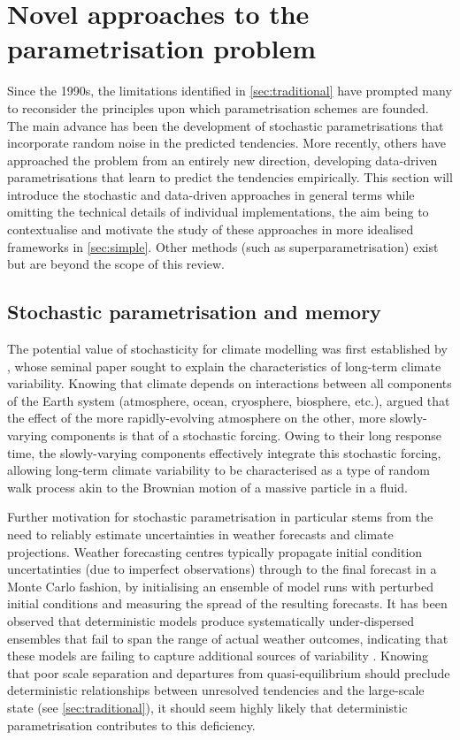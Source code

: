 \documentclass[titlepage,twoside]{article}
\numberwithin{equation}{section}
\begin{document}
\clearpage
\section{Novel approaches to the parametrisation problem}%
\label{sec:novel}
Since the 1990s, the limitations identified in \cref{sec:traditional} have
prompted many to reconsider the principles upon which parametrisation schemes
are founded. The main advance has been the development of stochastic
parametrisations that incorporate random noise in the predicted tendencies.
More recently, others have approached the problem from an entirely new
direction, developing data-driven parametrisations that learn to predict the
tendencies empirically. This section will introduce the stochastic and
data-driven approaches in general terms while omitting the technical details of
individual implementations, the aim being to contextualise and motivate the
study of these approaches in more idealised frameworks in \cref{sec:simple}.
Other methods (such as superparametrisation) exist but are beyond the scope of
this review.


\subsection{Stochastic parametrisation and memory}
The potential value of stochasticity for climate modelling was first
established by \textcite{hasselmann1976}, whose seminal paper sought to explain
the characteristics of long-term climate variability. Knowing that climate
depends on interactions between all components of the Earth system
(atmosphere, ocean, cryosphere, biosphere, etc.), \citeauthor{hasselmann1976}
argued that the effect of the more rapidly-evolving atmosphere on the other,
more slowly-varying components is that of a stochastic forcing. Owing to
their long response time, the slowly-varying components effectively integrate
this stochastic forcing, allowing long-term climate variability to be
characterised as a type of random walk process akin to the Brownian motion
of a massive particle in a fluid.

Further motivation for stochastic parametrisation in particular stems from the
need to reliably estimate uncertainties in weather forecasts and climate
projections. Weather forecasting centres typically propagate initial condition
uncertatinties (due to imperfect observations) through to the final forecast in
a Monte Carlo fashion, by initialising an ensemble of model runs with perturbed
initial conditions and measuring the spread of the resulting forecasts. It has
been observed that deterministic models produce systematically under-dispersed
ensembles that fail to span the range of actual weather outcomes, indicating
that these models are failing to capture additional sources of variability
\parencite{palmer2005,berner2017,palmer2019}. Knowing that poor scale
separation and departures from quasi-equilibrium should preclude deterministic
relationships between unresolved tendencies and the large-scale state (see
\cref{sec:traditional}), it should seem highly likely that deterministic
parametrisation contributes to this deficiency.
\end{document}
